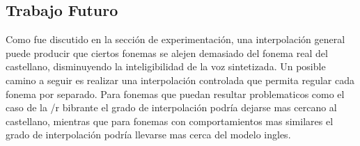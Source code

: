 \subsection{Trabajo Futuro}

Como fue discutido en la sección de experimentación, una interpolación general puede producir que ciertos fonemas se alejen demasiado del fonema real del castellano, disminuyendo la inteligibilidad de la voz sintetizada. Un posible camino a seguir es realizar una interpolación controlada que permita regular cada fonema por separado. Para fonemas que puedan resultar problematicos como el caso de la /r bibrante el grado de interpolación podría dejarse mas cercano al castellano, mientras que para fonemas con comportamientos mas similares el grado de interpolación podría llevarse mas cerca del modelo ingles.

